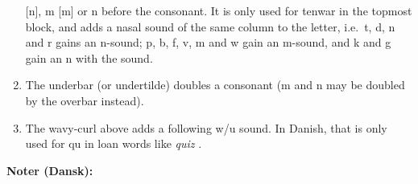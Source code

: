 \documentclass[a4paper]{article}
\begin{document}
\begin{enumerate}
  [n], m [m] or n \textipa{[N]} before the consonant.  It is only used
  for tenwar in the topmost block, and adds a nasal sound of the same
  column to the letter, i.e.\ t, d, n and r gains an n-sound; p, b, f,
  v, m and w gain an m-sound, and k and g gain an n with the
  \textipa{[N]} sound.\label{noteNasal}
\item The underbar (or undertilde) doubles a consonant (m and n may be
  doubled by the overbar instead).\label{noteDbl}
\item The wavy-curl above adds a following w/u sound.  In Danish, that
  is only used for qu in loan words like \emph{quiz}
  \Tquesse\TTtilde\Tessenuquerna\TTdot.\label{noteTilde}
\end{enumerate}

{\Large \textbf{Noter (Dansk):}\par}
\end{document}
